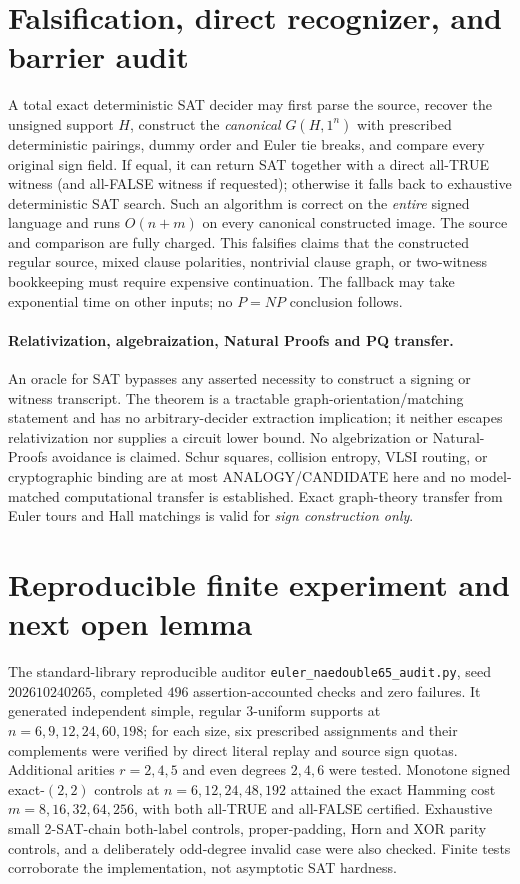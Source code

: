 \documentclass[11pt]{article}
\begin{document}
\section{Falsification, direct recognizer, and barrier audit}
A total exact deterministic SAT decider may first parse the source, recover the unsigned support \(H\), construct the \emph{canonical} \(G(H,1^n)\) with prescribed deterministic pairings, dummy order and Euler tie breaks, and compare every original sign field. If equal, it can return SAT together with a direct all-TRUE witness (and all-FALSE witness if requested); otherwise it falls back to exhaustive deterministic SAT search. Such an algorithm is correct on the \emph{entire} signed language and runs \(O(n+m)\) on every canonical constructed image. The source and comparison are fully charged. This falsifies claims that the constructed regular source, mixed clause polarities, nontrivial clause graph, or two-witness bookkeeping must require expensive continuation. The fallback may take exponential time on other inputs; no \(P=NP\) conclusion follows.

\paragraph{Relativization, algebraization, Natural Proofs and PQ transfer.}
An oracle for SAT bypasses any asserted necessity to construct a signing or witness transcript. The theorem is a tractable graph-orientation/matching statement and has no arbitrary-decider extraction implication; it neither escapes relativization nor supplies a circuit lower bound. No algebrization or Natural-Proofs avoidance is claimed. Schur squares, collision entropy, VLSI routing, or cryptographic binding are at most ANALOGY/CANDIDATE here and no model-matched computational transfer is established. Exact graph-theory transfer from Euler tours and Hall matchings is valid for \emph{sign construction only}.

\section{Reproducible finite experiment and next open lemma}
The standard-library reproducible auditor \texttt{euler\_naedouble65\_audit.py}, seed \(202610240265\), completed \(496\) assertion-accounted checks and zero failures. It generated independent simple, regular 3-uniform supports at \(n=6,9,12,24,60,198\); for each size, six prescribed assignments and their complements were verified by direct literal replay and source sign quotas. Additional arities \(r=2,4,5\) and even degrees \(2,4,6\) were tested. Monotone signed exact-$(2,2)$ controls at \(n=6,12,24,48,192\) attained the exact Hamming cost \(m=8,16,32,64,256\), with both all-TRUE and all-FALSE certified. Exhaustive small 2-SAT-chain both-label controls, proper-padding, Horn and XOR parity controls, and a deliberately odd-degree invalid case were also checked. Finite tests corroborate the implementation, not asymptotic SAT hardness.
\end{document}
